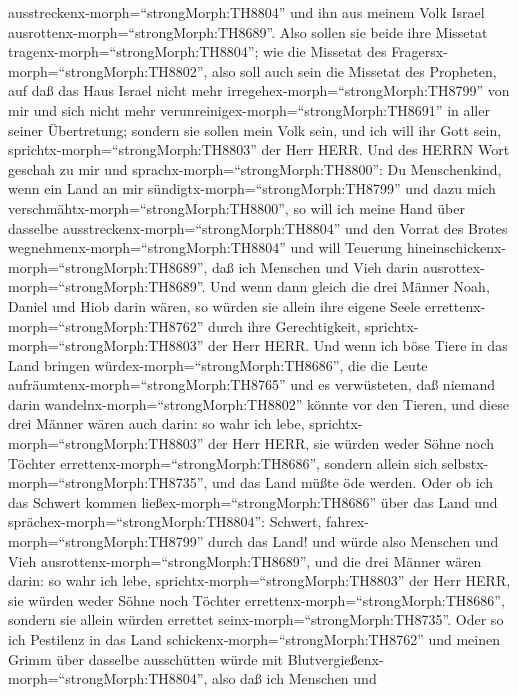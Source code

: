 ausstreckenx-morph=``strongMorph:TH8804'' und ihn aus meinem Volk Israel
ausrottenx-morph=``strongMorph:TH8689''.  Also sollen sie
beide ihre Missetat tragenx-morph=``strongMorph:TH8804''; wie die
Missetat des Fragersx-morph=``strongMorph:TH8802'', also soll auch sein
die Missetat des Propheten,  auf daß das Haus Israel nicht
mehr irregehex-morph=``strongMorph:TH8799'' von mir und sich nicht mehr
verunreinigex-morph=``strongMorph:TH8691'' in aller seiner Übertretung;
sondern sie sollen mein Volk sein, und ich will ihr Gott sein,
sprichtx-morph=``strongMorph:TH8803'' der Herr HERR.  Und
des HERRN Wort geschah zu mir und sprachx-morph=``strongMorph:TH8800'':
 Du Menschenkind, wenn ein Land an mir
sündigtx-morph=``strongMorph:TH8799'' und dazu mich
verschmähtx-morph=``strongMorph:TH8800'', so will ich meine Hand über
dasselbe ausstreckenx-morph=``strongMorph:TH8804'' und den Vorrat des
Brotes wegnehmenx-morph=``strongMorph:TH8804'' und will Teuerung
hineinschickenx-morph=``strongMorph:TH8689'', daß ich Menschen und Vieh
darin ausrottex-morph=``strongMorph:TH8689''.  Und wenn
dann gleich die drei Männer Noah, Daniel und Hiob darin wären, so würden
sie allein ihre eigene Seele errettenx-morph=``strongMorph:TH8762''
durch ihre Gerechtigkeit, sprichtx-morph=``strongMorph:TH8803'' der Herr
HERR.  Und wenn ich böse Tiere in das Land bringen
würdex-morph=``strongMorph:TH8686'', die die Leute
aufräumtenx-morph=``strongMorph:TH8765'' und es verwüsteten, daß niemand
darin wandelnx-morph=``strongMorph:TH8802'' könnte vor den Tieren,
 und diese drei Männer wären auch darin: so wahr ich lebe,
sprichtx-morph=``strongMorph:TH8803'' der Herr HERR, sie würden weder
Söhne noch Töchter errettenx-morph=``strongMorph:TH8686'', sondern
allein sich selbstx-morph=``strongMorph:TH8735'', und das Land müßte öde
werden.  Oder ob ich das Schwert kommen
ließex-morph=``strongMorph:TH8686'' über das Land und
sprächex-morph=``strongMorph:TH8804'': Schwert,
fahrex-morph=``strongMorph:TH8799'' durch das Land! und würde also
Menschen und Vieh ausrottenx-morph=``strongMorph:TH8689'', 
und die drei Männer wären darin: so wahr ich lebe,
sprichtx-morph=``strongMorph:TH8803'' der Herr HERR, sie würden weder
Söhne noch Töchter errettenx-morph=``strongMorph:TH8686'', sondern sie
allein würden errettet seinx-morph=``strongMorph:TH8735''. 
Oder so ich Pestilenz in das Land schickenx-morph=``strongMorph:TH8762''
und meinen Grimm über dasselbe ausschütten würde mit
Blutvergießenx-morph=``strongMorph:TH8804'', also daß ich Menschen und
